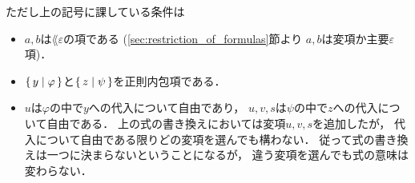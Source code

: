 	ただし上の記号に課している条件は
	\begin{itemize}
		\item $a,b$は$\lang{\varepsilon}$の項である
			(\ref{sec:restriction_of_formulas}節より
			$a,b$は変項か主要$\varepsilon$項)．
		\item $\{\, y \mid \varphi\, \}$と$\{\, z \mid \psi\, \}$を正則内包項である．
		\item $u$は$\varphi$の中で$y$への代入について自由であり，
			$u,v,s$は$\psi$の中で$z$への代入について自由である．
			上の式の書き換えにおいては変項$u,v,s$を追加したが，
			代入について自由である限りどの変項を選んでも構わない．
			従って式の書き換えは一つに決まらないということになるが，
			違う変項を選んでも式の意味は変わらない．
	\end{itemize}
	
	
